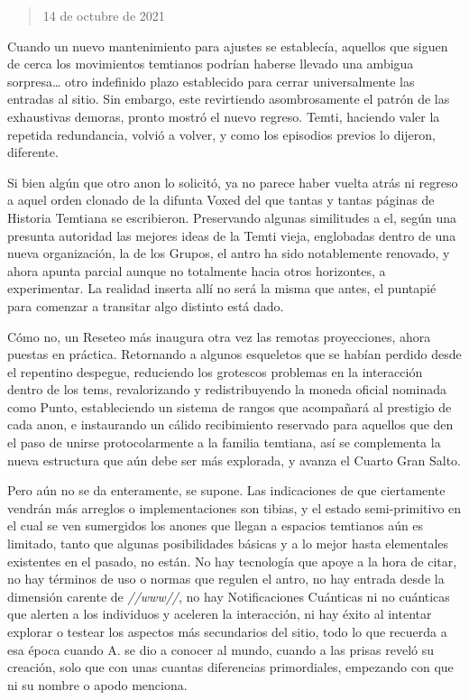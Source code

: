 \documentclass[
  spanish,
]{book}
\begin{document}
\begin{quote}
14 de octubre de 2021
\end{quote}

Cuando un nuevo mantenimiento para ajustes se establecía, aquellos que siguen de cerca los movimientos temtianos podrían haberse llevado una ambigua sorpresa\ldots{} otro indefinido plazo establecido para cerrar universalmente las entradas al sitio. Sin embargo, este revirtiendo asombrosamente el patrón de las exhaustivas demoras, pronto mostró el nuevo regreso. Temti, haciendo valer la repetida redundancia, volvió a volver, y como los episodios previos lo dijeron, diferente.

Si bien algún que otro anon lo solicitó, ya no parece haber vuelta atrás ni regreso a aquel orden clonado de la difunta Voxed del que tantas y tantas páginas de Historia Temtiana se escribieron. Preservando algunas similitudes a el, según una presunta autoridad las mejores ideas de la Temti vieja, englobadas dentro de una nueva organización, la de los Grupos, el antro ha sido notablemente renovado, y ahora apunta parcial aunque no totalmente hacia otros horizontes, a experimentar. La realidad inserta allí no será la misma que antes, el puntapié para comenzar a transitar algo distinto está dado.

Cómo no, un Reseteo más inaugura otra vez las remotas proyecciones, ahora puestas en práctica. Retornando a algunos esqueletos que se habían perdido desde el repentino despegue, reduciendo los grotescos problemas en la interacción dentro de los tems, revalorizando y redistribuyendo la moneda oficial nominada como Punto, estableciendo un sistema de rangos que acompañará al prestigio de cada anon, e instaurando un cálido recibimiento reservado para aquellos que den el paso de unirse protocolarmente a la familia temtiana, así se complementa la nueva estructura que aún debe ser más explorada, y avanza el Cuarto Gran Salto.

Pero aún no se da enteramente, se supone. Las indicaciones de que ciertamente vendrán más arreglos o implementaciones son tibias, y el estado semi-primitivo en el cual se ven sumergidos los anones que llegan a espacios temtianos aún es limitado, tanto que algunas posibilidades básicas y a lo mejor hasta elementales existentes en el pasado, no están. No hay tecnología que apoye a la hora de citar, no hay términos de uso o normas que regulen el antro, no hay entrada desde la dimensión carente de \emph{//www//}, no hay Notificaciones Cuánticas ni no cuánticas que alerten a los individuos y aceleren la interacción, ni hay éxito al intentar explorar o testear los aspectos más secundarios del sitio, todo lo que recuerda a esa época cuando A. se dio a conocer al mundo, cuando a las prisas reveló su creación, solo que con unas cuantas diferencias primordiales, empezando con que ni su nombre o apodo menciona.
\end{document}
